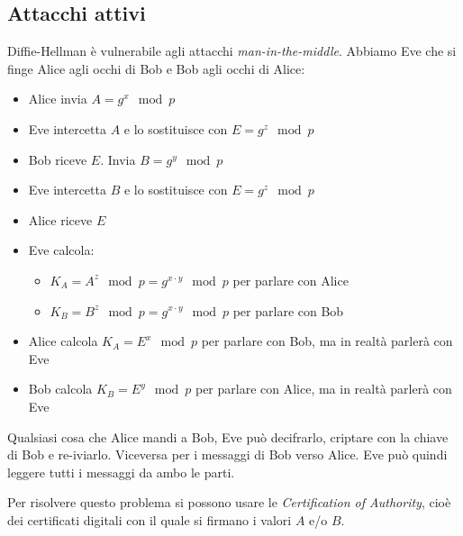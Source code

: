 \subsection{Attacchi attivi}
Diffie-Hellman è vulnerabile agli attacchi \emph{man-in-the-middle}. Abbiamo Eve che si finge Alice agli occhi di Bob e Bob agli occhi di Alice:
\begin{itemize}
    \item Alice invia $ A = g^x \mod p$
    \item Eve intercetta $A$ e lo sostituisce con $E = g^z \mod p$
    \item Bob riceve $E$. Invia $ B = g^y \mod p $
    \item Eve intercetta $B$ e lo sostituisce con $E = g^z \mod p$
    \item Alice riceve $E$
    \item Eve calcola:
    \begin{itemize}
        \item $K_A = A^z \mod p = g^{x \cdot y} \mod p$ per parlare con Alice
        \item $K_B = B^z \mod p = g^{x \cdot y} \mod p$ per parlare con Bob
    \end{itemize}
    \item Alice calcola $K_A = E^x \mod p$ per parlare con Bob, ma in realtà parlerà con Eve
    \item Bob calcola $K_B = E^y \mod p$ per parlare con Alice, ma in realtà parlerà con Eve
\end{itemize}

Qualsiasi cosa che Alice mandi a Bob, Eve può decifrarlo, criptare con la chiave di Bob e re-iviarlo.
Viceversa per i messaggi di Bob verso Alice.
Eve può quindi leggere tutti i messaggi da ambo le parti.

Per risolvere questo problema si possono usare le \emph{Certification of Authority}, cioè dei certificati digitali con il quale si firmano i valori $A$ e/o $B$.